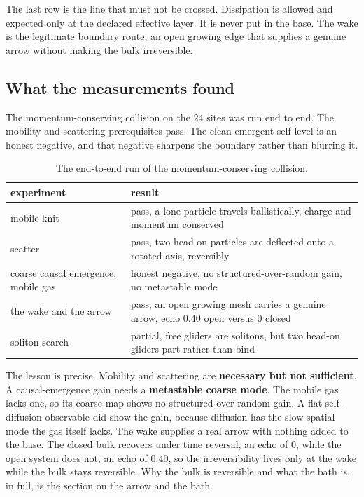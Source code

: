 The last row is the line that must not be crossed. Dissipation is allowed and expected only at the declared effective layer. It is never put in the base. The wake is the legitimate boundary route, an open growing edge that supplies a genuine arrow without making the bulk irreversible.

\subsection{What the measurements found}

The momentum-conserving collision on the $24$ sites was run end to end. The mobility and scattering prerequisites pass. The clean emergent self-level is an honest negative, and that negative sharpens the boundary rather than blurring it.

\begin{table}[ht]
\centering
\begin{tabular}{@{}ll@{}}
\toprule
experiment & result \\
\midrule
mobile knit & pass, a lone particle travels ballistically, charge and momentum conserved \\
scatter & pass, two head-on particles are deflected onto a rotated axis, reversibly \\
coarse causal emergence, mobile gas & honest negative, no structured-over-random gain, no metastable mode \\
the wake and the arrow & pass, an open growing mesh carries a genuine arrow, echo $0.40$ open versus $0$ closed \\
soliton search & partial, free gliders are solitons, but two head-on gliders part rather than bind \\
\bottomrule
\end{tabular}
\caption{The end-to-end run of the momentum-conserving collision.}
\label{tab:findings}
\end{table}

The lesson is precise. Mobility and scattering are \textbf{necessary but not sufficient}. A causal-emergence gain needs a \textbf{metastable coarse mode}. The mobile gas lacks one, so its coarse map shows no structured-over-random gain. A flat self-diffusion observable did show the gain, because diffusion has the slow spatial mode the gas itself lacks. The wake supplies a real arrow with nothing added to the base. The closed bulk recovers under time reversal, an echo of $0$, while the open system does not, an echo of $0.40$, so the irreversibility lives only at the wake while the bulk stays reversible. Why the bulk is reversible and what the bath is, in full, is the section on the arrow and the bath.

